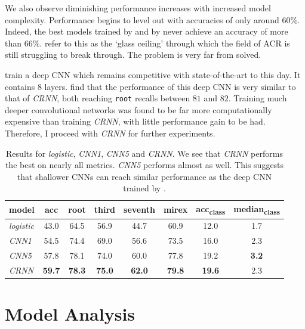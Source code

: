 We also observe diminishing performance increases with increased model complexity. Performance begins to level out with accuracies of only around $60\%$. Indeed, the best models trained by \citet{BTC} and by \citet{ChordFormer} never achieve an accuracy of more than $66\%$. \citet{FourTimelyInsights} refer to this as the `glass ceiling' through which the field of ACR is still struggling to break through. The problem is very far from solved.

\citet{FeatureMaps} train a deep CNN which remains competitive with state-of-the-art to this day. It contains 8 layers. \citet{BTC} find that the performance of this deep CNN is very similar to that of \emph{CRNN}, both reaching \texttt{root} recalls between $81$ and $82$. Training much deeper convolutional networks was found to be far more computationally expensive than training \emph{CRNN}, with little performance gain to be had. Therefore, I proceed with \emph{CRNN} for further experiments.

\begin{table}[H]
    \centering
    \begin{tabular}{lccccccc}
        \toprule
        model & acc & root & third & seventh & mirex & acc\textsubscript{class} & median\textsubscript{class} \\  
        \midrule
        \emph{logistic} & 43.0 & 64.5 & 56.9 & 44.7 & 60.9 & 12.0 & 1.7 \\
        \emph{CNN1} & 54.5 & 74.4 & 69.0 & 56.6 & 73.5 & 16.0 & 2.3 \\
        \emph{CNN5} & 57.8 & 78.1 & 74.0 & 60.0 & 77.8 & 19.2 & \textbf{3.2} \\
        \emph{CRNN} & \textbf{59.7} & \textbf{78.3} & \textbf{75.0} & \textbf{62.0} & \textbf{79.8} & \textbf{19.6} & 2.3 \\
        \bottomrule
    \end{tabular}
    \caption{Results for \emph{logistic}, \emph{CNN1}, \emph{CNN5} and \emph{CRNN}. We see that \emph{CRNN} performs the best on nearly all metrics. \emph{CNN5} performs almost as well. This suggests that shallower CNNs can reach similar performance as the deep CNN trained by \citet{FeatureMaps}.}\label{tab:first_results}
\end{table}

\section{Model Analysis}\label{sec:crnn_analysis}

